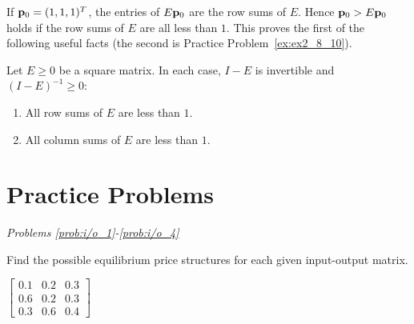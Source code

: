 \documentclass{ximera}
\begin{document}
If ${\bf p}_{0} = (1, 1, 1)^{T}$, the entries of $E{\bf p}_{0}$ are the row sums of $E$. Hence ${\bf p}_{0} > E{\bf p}_{0}$ holds if the row sums of $E$ are all less than $1$. This proves the first of the following useful facts (the second is Practice Problem~\ref{ex:ex2_8_10}).

\begin{corollary}\label{007090}
Let $E \geq 0$ be a square matrix. In each case, $I - E$ is invertible and $(I - E)^{-1} \geq 0$:

\begin{enumerate}
\item All row sums of $E$ are less than $1$.

\item All column sums of $E$ are less than $1$.

\end{enumerate}
\end{corollary}


\section*{Practice Problems}

\emph{Problems \ref{prob:i/o_1}-\ref{prob:i/o_4}}

Find the possible equilibrium price structures for each given input-output matrix.
\begin{problem}\label{prob:i/o_1}

$\begin{bmatrix}
0.1 & 0.2 & 0.3 \\
0.6 & 0.2 & 0.3 \\
0.3 & 0.6 & 0.4
\end{bmatrix}$


\end{problem}
\end{document}
